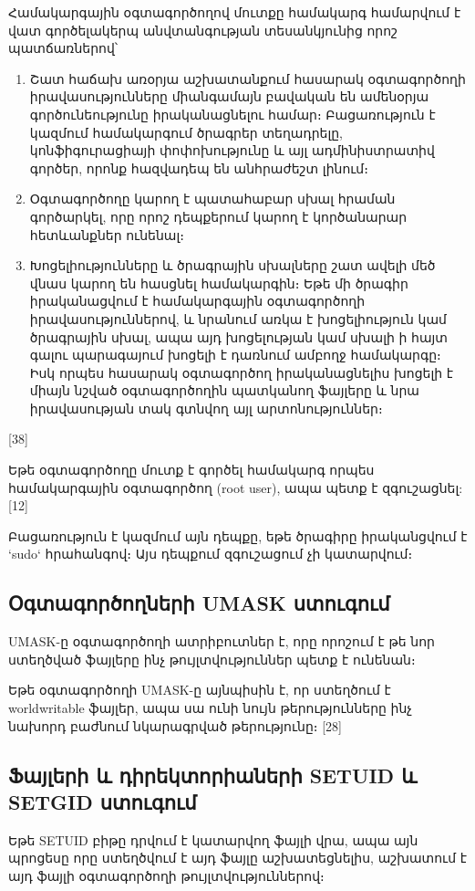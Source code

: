 \documentclass[12pt]{article}
\begin{document}
\begin{sloppypar}
Համակարգային օգտագործողով մուտքը համակարգ համարվում է վատ
գործելակերպ անվտանգության տեսանկյունից որոշ պատճառներով՝
\begin{enumerate}
\item Շատ հաճախ առօրյա աշխատանքում հասարակ օգտագործողի իրավասությունները
	միանգամայն բավական են ամենօրյա գործունեությունը իրականացնելու համար։
	Բացառություն է կազմում համակարգում ծրագրեր տեղադրելը, կոնֆիգուրացիայի
	փոփոխությունը և այլ ադմինիստրատիվ գործեր, որոնք հազվադեպ են անհրաժեշտ
	լինում։
\item Օգտագործողը կարող է պատահաբար սխալ հրաման գործարկել, որը որոշ
	դեպքերում կարող է կործանարար հետևանքներ ունենալ։
\item Խոցելիությունները և ծրագրային սխալները շատ ավելի մեծ վնաս կարող են
	հասցնել համակարգին։ Եթե մի ծրագիր իրականացվում է համակարգային
	օգտագործողի իրավասություններով, և նրանում առկա է խոցելիություն կամ
	ծրագրային սխալ, ապա այդ խոցելության կամ սխալի ի հայտ գալու պարագայում
	խոցելի է դառնում ամբողջ համակարգը։ Իսկ որպես հասարակ օգտագործող
	իրականացնելիս խոցելի է միայն նշված օգտագործողին պատկանող ֆայլերը և
	նրա իրավասության տակ գտնվող այլ արտոնություններ։
\end{enumerate}
[38]

Եթե օգտագործողը մուտք է գործել համակարգ որպես
համակարգային օգտագործող (root user), ապա պետք է զգուշացնել: [12]

Բացառություն է կազմում այն դեպքը, եթե ծրագիրը իրականցվում է
`sudo` հրահանգով։ Այս դեպքում զգուշացում չի կատարվում։



\subsection{Օգտագործողների UMASK ստուգում}


UMASK-ը օգտագործողի ատրիբուտներ է, որը
որոշում է թե նոր ստեղծված ֆայլերը ինչ թույլտվություններ
պետք է ունենան։

Եթե օգտագործողի UMASK-ը այնպիսին է, որ ստեղծում է
worldwritable ֆայլեր, ապա սա ունի նույն թերությունները
ինչ նախորդ բաժնում նկարագրված թերությունը։
[28]


\subsection{Ֆայլերի և դիրեկտորիաների SETUID և SETGID ստուգում}


Եթե SETUID բիթը դրվում է կատարվող ֆայլի վրա, ապա
այն պրոցեսը որը ստեղծվում է այդ ֆայլը աշխատեցնելիս,
աշխատում է այդ ֆայլի օգտագործողի թույլտվություններով։


\end{sloppypar}
\end{document}
